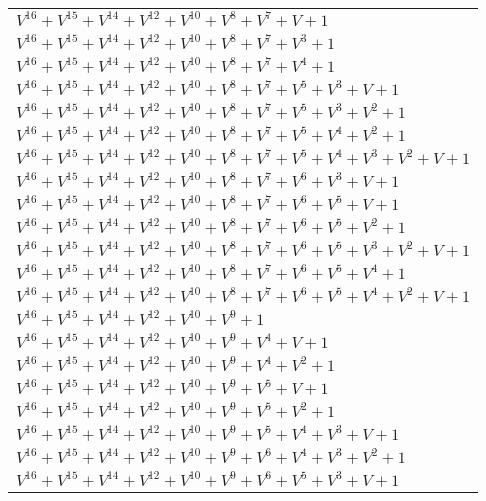 \documentclass[12pt]{article}
\begin{document}
\begin{adjustwidth}{-4cm}{}
\begin{center}
\begin{longtable}{|l|}
$V^{16}  +V^{15}  +V^{14}  +V^{12}  +V^{10}  +V^{8}  +V^{7}  + V + 1$ \\
$V^{16}  +V^{15}  +V^{14}  +V^{12}  +V^{10}  +V^{8}  +V^{7}  +V^{3}  + 1$ \\
$V^{16}  +V^{15}  +V^{14}  +V^{12}  +V^{10}  +V^{8}  +V^{7}  +V^{4}  + 1$ \\
$V^{16}  +V^{15}  +V^{14}  +V^{12}  +V^{10}  +V^{8}  +V^{7}  +V^{5}  +V^{3}  + V + 1$ \\
$V^{16}  +V^{15}  +V^{14}  +V^{12}  +V^{10}  +V^{8}  +V^{7}  +V^{5}  +V^{3}  +V^{2}  + 1$ \\
$V^{16}  +V^{15}  +V^{14}  +V^{12}  +V^{10}  +V^{8}  +V^{7}  +V^{5}  +V^{4}  +V^{2}  + 1$ \\
$V^{16}  +V^{15}  +V^{14}  +V^{12}  +V^{10}  +V^{8}  +V^{7}  +V^{5}  +V^{4}  +V^{3}  +V^{2}  + V + 1$ \\
$V^{16}  +V^{15}  +V^{14}  +V^{12}  +V^{10}  +V^{8}  +V^{7}  +V^{6}  +V^{3}  + V + 1$ \\
$V^{16}  +V^{15}  +V^{14}  +V^{12}  +V^{10}  +V^{8}  +V^{7}  +V^{6}  +V^{5}  + V + 1$ \\
$V^{16}  +V^{15}  +V^{14}  +V^{12}  +V^{10}  +V^{8}  +V^{7}  +V^{6}  +V^{5}  +V^{2}  + 1$ \\
$V^{16}  +V^{15}  +V^{14}  +V^{12}  +V^{10}  +V^{8}  +V^{7}  +V^{6}  +V^{5}  +V^{3}  +V^{2}  + V + 1$ \\
$V^{16}  +V^{15}  +V^{14}  +V^{12}  +V^{10}  +V^{8}  +V^{7}  +V^{6}  +V^{5}  +V^{4}  + 1$ \\
$V^{16}  +V^{15}  +V^{14}  +V^{12}  +V^{10}  +V^{8}  +V^{7}  +V^{6}  +V^{5}  +V^{4}  +V^{2}  + V + 1$ \\
$V^{16}  +V^{15}  +V^{14}  +V^{12}  +V^{10}  +V^{9}  + 1$ \\
$V^{16}  +V^{15}  +V^{14}  +V^{12}  +V^{10}  +V^{9}  +V^{4}  + V + 1$ \\
$V^{16}  +V^{15}  +V^{14}  +V^{12}  +V^{10}  +V^{9}  +V^{4}  +V^{2}  + 1$ \\
$V^{16}  +V^{15}  +V^{14}  +V^{12}  +V^{10}  +V^{9}  +V^{5}  + V + 1$ \\
$V^{16}  +V^{15}  +V^{14}  +V^{12}  +V^{10}  +V^{9}  +V^{5}  +V^{2}  + 1$ \\
$V^{16}  +V^{15}  +V^{14}  +V^{12}  +V^{10}  +V^{9}  +V^{5}  +V^{4}  +V^{3}  + V + 1$ \\
$V^{16}  +V^{15}  +V^{14}  +V^{12}  +V^{10}  +V^{9}  +V^{6}  +V^{4}  +V^{3}  +V^{2}  + 1$ \\
$V^{16}  +V^{15}  +V^{14}  +V^{12}  +V^{10}  +V^{9}  +V^{6}  +V^{5}  +V^{3}  + V + 1$ \\

\end{longtable}
\end{center}
\end{adjustwidth}
\end{document}

